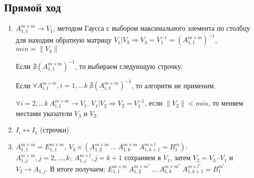 \documentclass[12pt]{report}
\begin{document}
        \subsection{Прямой ход}
        \begin{enumerate}
            \item \label{alg:reverse} $ A^{m \times m}_{1,1} \rightarrow V_{1} $, методом Гаусса с выбором
            максимального элемента по столбцу для находим обратную матрицу $V_{1} | V_{3} \Rightarrow V_{3} = V_{1}^{-1}
            =  (A^{m \times m}_{1,1})^{-1}$, $min = \| V_{3} \|  $ 
            
            Если $ \nexists (A^{m \times m}_{1,1})^{-1}$, то выбираем следующую строчку.
            
            Если $\forall A^{m \times m}_{i,1}, i = 1, \ldots k \ \nexists (A^{m \times m}_{i,1})^{-1}$,
            то алгоритм не применим.
            
            $\forall i = 2, \ldots k \ A^{m \times m}_{i,1} \rightarrow V_{1}$.
            $V_{1} | V_{2} \Rightarrow V_{2} = V_{1}^{-1}$, если $\| V_{2} \| < min$, 
            то меняем местами указатели $V_{3}$ и $V_{2}$.   
            
            \item \label{alg:swap} $I_{i} \leftrightarrow I_{1}$ (строчки)
            
            \item \label{alg:mult} 
            $A_{1,1}^{m \times m} = E_{1,1}^{m \times m}, \ V_{3} \times (A_{1,2}^{m \times m} \ \ldots \ A_{1,k}^{m \times m} \ A_{1,k+1}^{m \times l}
             = B^{m}_{1})$: \\
            $A_{1,j}^{m \times m}, j = 2, \ldots, k; \ A_{1,j}^{m \times l}, j = k + 1$ сохраняем в $V_{1}$,
            затем $V_{2} = V_{3} \cdot V_{1}$ и $V_{2} \rightarrow A_{1,j}$.
            В итоге получаем: $ E_{1,1}^{m \times m} \ A_{1,2}^{m \times m^*}    \ \ldots \ A_{1,k}^{m \times m^*} \ A_{1,k+1}^{m \times l^*} = B^{m^*}_{1}$
            

\end{enumerate}
\end{document}
